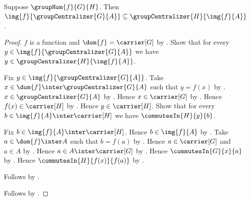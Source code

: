 \begin{theorem}\label{group_hom_image_centralizer_subseteq}
    Suppose $\groupHom{f}{G}{H}$.
    Then
        $\img{f}{\groupCentralizer{G}{A}}
            \subseteq
        \groupCentralizer{H}{\img{f}{A}}$.
\end{theorem}
\begin{proof}
    $f$ is a function and $\dom{f}=\carrier[G]$ by
        .
    Show that for every
        $y\in\img{f}{\groupCentralizer{G}{A}}$ we have
        $y\in\groupCentralizer{H}{\img{f}{A}}$.
    \begin{subproof}
        Fix $y\in\img{f}{\groupCentralizer{G}{A}}$.
        Take
            $x\in\dom{f}\inter\groupCentralizer{G}{A}$ such that
            $y=f(x)$ by .
        $x\in\groupCentralizer{G}{A}$ by .
        Hence $x\in\carrier[G]$ by .
        Hence $f(x)\in\carrier[H]$ by .
        Hence $y\in\carrier[H]$.
        Show that for every $b\in\img{f}{A}\inter\carrier[H]$ we have
            $\commutesIn{H}{y}{b}$.
        \begin{subproof}
            Fix $b\in\img{f}{A}\inter\carrier[H]$.
            Hence $b\in\img{f}{A}$ by .
            Take $a\in\dom{f}\inter A$ such that $b=f(a)$ by
                .
            Hence $a\in\carrier[G]$ and $a\in A$ by
                .
            Hence $a\in A\inter\carrier[G]$ by .
            Hence $\commutesIn{G}{x}{a}$ by
                .
            Hence $\commutesIn{H}{f(x)}{f(a)}$ by
                .
        \end{subproof}
        Follows by .
    \end{subproof}
    Follows by .
\end{proof}

